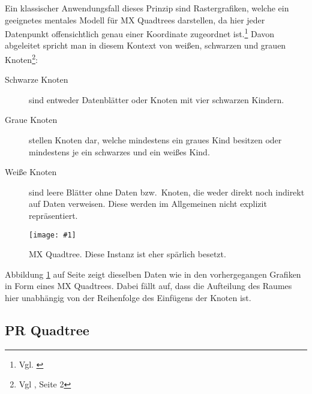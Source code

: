 \documentclass[%
			paper=a4,%
			DIV12,
			liststotoc,
			bibtotoc,
			draft=false,%
			titlepage
			]{scrartcl}
\newcommand{\zit}[3]{#1 \cite{#2}, #3}
\newcommand{\zitx}[2]{#1 \cite{#2}}
\newcommand{\footzit}[3]{\footnote{\zit{#1}{#2}{#3}}}
\newcommand{\footzitx}[2]{\footnote{\zitx{#1}{#2}}}
\newcommand{\myfig}[5] {
 \begin{figure}[tbph]
	 \centering
	 \texttt{[image: \#1]}
	 \caption[#4]{#5}
	 \label{fig:#2}
 \end{figure}
}
\begin{document}
Ein klassischer Anwendungsfall dieses Prinzip sind Rastergrafiken, welche ein geeignetes mentales Modell für MX Quadtrees darstellen, da hier jeder Datenpunkt offensichtlich genau einer Koordinate zugeordnet ist.\footzitx{Vgl.}{bb29082}
Davon abgeleitet spricht man in diesem Kontext von weißen, schwarzen und grauen Knoten\footzit{Vgl}{DBLP:journals/cacm/Gargantini82}{Seite 2}:%
\begin{description}
	\item[Schwarze Knoten] sind entweder Datenblätter oder Knoten mit vier schwarzen Kindern.
	\item[Graue Knoten] stellen Knoten dar, welche mindestens ein graues Kind besitzen oder mindestens je ein schwarzes und ein weißes Kind.
	\item[Weiße Knoten] sind leere Blätter ohne Daten bzw.\ Knoten, die weder direkt noch indirekt auf Daten verweisen. Diese werden im Allgemeinen nicht explizit repräsentiert.
\end{description}


\myfig{img/mxquadtre-full-origdata-trimmed}{mxquadtree}{width=.7\textwidth}{MX Quadtree}{MX Quadtree. Diese Instanz ist eher spärlich besetzt.}
Abbildung \ref{fig:mxquadtree} auf Seite \pageref{fig:mxquadtree} zeigt dieselben Daten wie in den vorhergegangen Grafiken in Form eines MX Quadtrees. Dabei fällt auf, dass die Aufteilung des Raumes hier unabhängig von der Reihenfolge des Einfügens der Knoten ist.







% 

\cite{Samet:1985:SCP:282957.282966}


\subsection{PR Quadtree}
\end{document}
